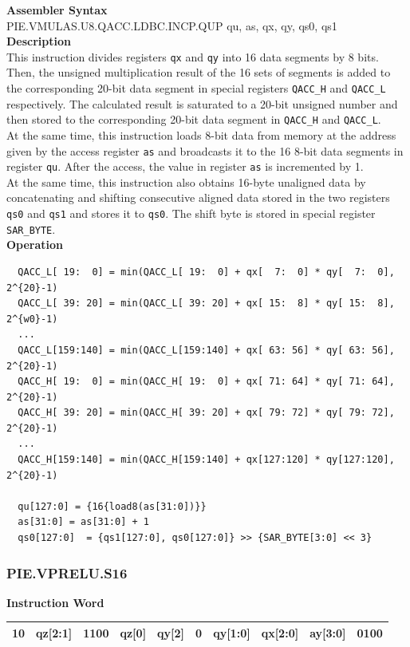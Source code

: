 \textbf{Assembler Syntax} \\
PIE.VMULAS.U8.QACC.LDBC.INCP.QUP qu, as, qx, qy, qs0, qs1 \\
\textbf{Description} \\
This instruction divides registers \lstinline{qx} and \lstinline{qy} into 16 data segments by 8 bits. Then, the unsigned multiplication result of the 16 sets of segments is added to the corresponding 20-bit data segment in special registers \lstinline{QACC_H} and \lstinline{QACC_L} respectively. The calculated result is saturated to a 20-bit unsigned number and then stored to the corresponding 20-bit data segment in \lstinline{QACC_H} and \lstinline{QACC_L}.\\
At the same time, this instruction loads 8-bit data from memory at the address given by the access register \lstinline{as} and broadcasts it to the 16 8-bit data segments in register \lstinline{qu}. After the access, the value in register \lstinline{as} is incremented by 1.\\
At the same time, this instruction also obtains 16-byte unaligned data by concatenating and shifting consecutive aligned data stored in the two registers \lstinline{qs0} and \lstinline{qs1} and stores it to \lstinline{qs0}. The shift byte is stored in special register \lstinline{SAR_BYTE}.\\
\textbf{Operation}
\begin{lstlisting}
  QACC_L[ 19:  0] = min(QACC_L[ 19:  0] + qx[  7:  0] * qy[  7:  0], 2^{20}-1)
  QACC_L[ 39: 20] = min(QACC_L[ 39: 20] + qx[ 15:  8] * qy[ 15:  8], 2^{w0}-1)
  ...
  QACC_L[159:140] = min(QACC_L[159:140] + qx[ 63: 56] * qy[ 63: 56], 2^{20}-1)
  QACC_H[ 19:  0] = min(QACC_H[ 19:  0] + qx[ 71: 64] * qy[ 71: 64], 2^{20}-1)
  QACC_H[ 39: 20] = min(QACC_H[ 39: 20] + qx[ 79: 72] * qy[ 79: 72], 2^{20}-1)
  ...
  QACC_H[159:140] = min(QACC_H[159:140] + qx[127:120] * qy[127:120], 2^{20}-1)

  qu[127:0] = {16{load8(as[31:0])}}
  as[31:0] = as[31:0] + 1
  qs0[127:0]  = {qs1[127:0], qs0[127:0]} >> {SAR_BYTE[3:0] << 3}
\end{lstlisting}

\newpage
\subsubsection{PIE.VPRELU.S16}\label{instruction:PIEVPRELUS16}
\setlength\tabcolsep{6pt}
\textbf{Instruction Word} \\
\begin{tabular}{|c|c|c|c|c|c|c|c|c|c|}
	\hline
	10 & qz[2:1] & 1100 & qz[0] & qy[2] & 0 & qy[1:0] & qx[2:0] & ay[3:0] & 0100 \\
	\hline
\end{tabular}

